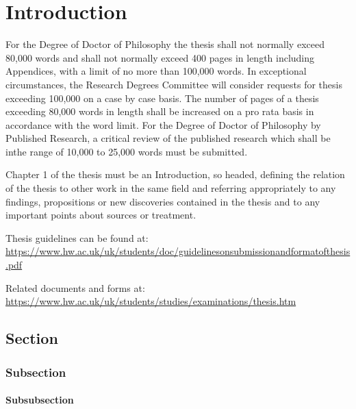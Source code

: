 \documentclass[../HWThesis.tex]{subfiles}
\begin{document}
\chapter{Introduction}
\label{ch:introduction}

For the Degree of Doctor of Philosophy the thesis shall not normally exceed 80,000 words and shall not normally exceed 400 pages in length including Appendices, with a limit of no more than 100,000 words. In exceptional circumstances, the Research Degrees Committee will consider requests for thesis exceeding 100,000 on a case by case basis. The number of pages of a thesis exceeding 80,000 words in length shall be increased on a pro rata basis in accordance with the word limit.  For the Degree of Doctor of Philosophy by Published Research, a critical review of the published research which shall be inthe range of 10,000 to 25,000 words must be submitted.

Chapter 1 of the thesis must be an Introduction, so headed, defining the relation of the thesis to other work in the same field and referring appropriately to any findings, propositions or new discoveries contained in the thesis and to any important points about sources or treatment.

Thesis guidelines can be found at: \\ \url{https://www.hw.ac.uk/uk/students/doc/guidelinesonsubmissionandformatofthesis.pdf }

Related documents and forms at: \url{https://www.hw.ac.uk/uk/students/studies/examinations/thesis.htm}

\section{Section}

\cite{ghc-pps}

\subsection{Subsection}

\subsubsection{Subsubsection}
\end{document}
